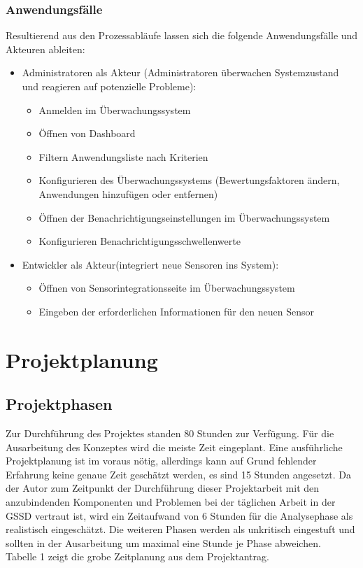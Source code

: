 \begin{flushleft}
		\subsubsection{Anwendungsfälle}
		Resultierend aus den Prozessabläufe lassen sich die folgende Anwendungsfälle und Akteuren ableiten:
	\begin{itemize}
	\item Administratoren als Akteur (Administratoren überwachen Systemzustand und reagieren auf potenzielle Probleme):
	\begin{itemize}
	\item Anmelden im Überwachungssystem
	\item Öffnen von Dashboard
	\item Filtern Anwendungsliste nach Kriterien
	\item Konfigurieren des Überwachungssystems (Bewertungsfaktoren ändern, Anwendungen hinzufügen oder entfernen)
	\item Öffnen der Benachrichtigungseinstellungen im Überwachungssystem
	\item Konfigurieren Benachrichtigungsschwellenwerte
	\end{itemize}

		\item Entwickler als Akteur(integriert neue Sensoren ins System):
		\begin{itemize}
				\item  Öffnen von Sensorintegrationsseite im Überwachungssystem
				\item  Eingeben der erforderlichen Informationen für den neuen Sensor

		\end{itemize}
		\end{itemize}



	\section{Projektplanung}

	\subsection{Projektphasen}
	Zur Durchführung des Projektes standen 80 Stunden zur Verfügung. Für die Ausarbeitung des Konzeptes
	wird die meiste Zeit eingeplant. Eine ausführliche Projektplanung ist im voraus nötig, allerdings kann auf
	Grund fehlender Erfahrung keine genaue Zeit geschätzt werden, es sind 15 Stunden angesetzt. Da der
	Autor zum Zeitpunkt der Durchführung dieser Projektarbeit mit den anzubindenden Komponenten und
	Problemen bei der täglichen Arbeit in der \acs{GSSD} vertraut ist, wird ein Zeitaufwand von 6 Stunden für die
	Analysephase als realistisch eingeschätzt. Die weiteren Phasen werden als unkritisch eingestuft und
	sollten in der Ausarbeitung um maximal eine Stunde je Phase abweichen.
	\\
	Tabelle 1 zeigt die grobe Zeitplanung aus dem Projektantrag.



\end{flushleft}
